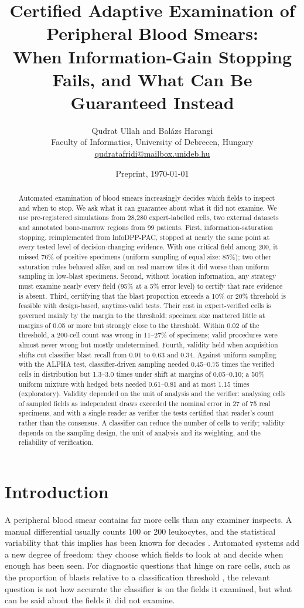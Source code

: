 \documentclass[11pt]{article}
\title{Certified Adaptive Examination of Peripheral Blood Smears:\\
When Information-Gain Stopping Fails, and What Can Be Guaranteed Instead}
\author{%
\begin{tabular}{c}
Qudrat Ullah and Bal\'azs Harangi\\[4pt]
\normalsize Faculty of Informatics, University of Debrecen, Hungary\\
\normalsize \href{mailto:qudratafridi@mailbox.unideb.hu}{qudratafridi@mailbox.unideb.hu}
\end{tabular}}
\date{Preprint, \today}
\theoremstyle{remark}
\theoremstyle{definition}
\begin{document}
\maketitle

\begin{abstract}
Automated examination of blood smears increasingly decides which fields to inspect and when to stop. We ask what it can guarantee about what it did not examine. We use pre-registered simulations from 28,280 expert-labelled cells, two external datasets and annotated bone-marrow regions from 99 patients. First, information-saturation stopping, reimplemented from InfoDPP-PAC, stopped at nearly the same point at every tested level of decision-changing evidence. With one critical field among 200, it missed 76\% of positive specimens (uniform sampling of equal size: 85\%); two other saturation rules behaved alike, and on real marrow tiles it did worse than uniform sampling in low-blast specimens. Second, without location information, any strategy must examine nearly every field (95\% at a 5\% error level) to certify that rare evidence is absent. Third, certifying that the blast proportion exceeds a 10\% or 20\% threshold is feasible with design-based, anytime-valid tests. Their cost in expert-verified cells is governed mainly by the margin to the threshold; specimen size mattered little at margins of 0.05 or more but strongly close to the threshold. Within 0.02 of the threshold, a 200-cell count was wrong in 11--27\% of specimens; valid procedures were almost never wrong but mostly undetermined. Fourth, validity held when acquisition shifts cut classifier blast recall from 0.91 to 0.63 and 0.34. Against uniform sampling with the ALPHA test, classifier-driven sampling needed 0.45--0.75 times the verified cells in distribution but 1.3--3.0 times under shift at margins of 0.05--0.10; a 50\% uniform mixture with hedged bets needed 0.61--0.81 and at most 1.15 times (exploratory). Validity depended on the unit of analysis and the verifier: analysing cells of sampled fields as independent draws exceeded the nominal error in 27 of 75 real specimens, and with a single reader as verifier the tests certified that reader's count rather than the consensus. A classifier can reduce the number of cells to verify; validity depends on the sampling design, the unit of analysis and its weighting, and the reliability of verification.
\end{abstract}

\section{Introduction}
A peripheral blood smear contains far more cells than any examiner inspects. A manual differential usually counts 100 or 200 leukocytes, and the statistical variability that this implies has been known for decades \cite{rumke1978}. Automated systems add a new degree of freedom: they choose which fields to look at and decide when enough has been seen. For diagnostic questions that hinge on rare cells, such as the proportion of blasts relative to a classification threshold \cite{khoury2022who,arber2022icc}, the relevant question is not how accurate the classifier is on the fields it examined, but what can be said about the fields it did not examine.
\end{document}
